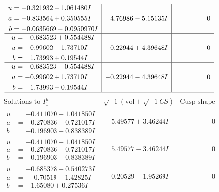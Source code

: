 \documentclass[1p]{elsarticle_modified}
\theoremstyle{definition}
\newcommand{\I}{\sqrt{-1}}
\begin{document}
$$\begin{array}{c|c|c}
\begin{aligned}
u &= -0.321932 - 1.061480 I \\
a &= -0.833564 + 0.350555 I \\
b &= -0.0635669 - 0.0950970 I\end{aligned}
 & \phantom{-}4.76986 - 5.15135 I & \phantom{-0.000000 } 0 \\ \hline\begin{aligned}
u &= \phantom{-}0.683523 + 0.554488 I \\
a &= -0.99602 - 1.73710 I \\
b &= \phantom{-}1.73993 + 0.19544 I\end{aligned}
 & -0.22944 + 4.39648 I & \phantom{-0.000000 } 0 \\ \hline\begin{aligned}
u &= \phantom{-}0.683523 - 0.554488 I \\
a &= -0.99602 + 1.73710 I \\
b &= \phantom{-}1.73993 - 0.19544 I\end{aligned}
 & -0.22944 - 4.39648 I & \phantom{-0.000000 } 0\\
 \hline 
 \end{array}$$\newpage$$\begin{array}{c|c|c}  
\text{Solutions to }I^u_{1}& \I (\text{vol} + \sqrt{-1}CS) & \text{Cusp shape}\\
 \hline 
\begin{aligned}
u &= -0.411070 + 1.041850 I \\
a &= -0.270836 + 0.721017 I \\
b &= -0.196903 - 0.838389 I\end{aligned}
 & \phantom{-}5.49577 + 3.46244 I & \phantom{-0.000000 } 0 \\ \hline\begin{aligned}
u &= -0.411070 - 1.041850 I \\
a &= -0.270836 - 0.721017 I \\
b &= -0.196903 + 0.838389 I\end{aligned}
 & \phantom{-}5.49577 - 3.46244 I & \phantom{-0.000000 } 0 \\ \hline\begin{aligned}
u &= -0.685378 + 0.540273 I \\
a &= \phantom{-}0.70519 - 1.42825 I \\
b &= -1.65080 + 0.27536 I\end{aligned}
 & \phantom{-}0.20529 - 1.95269 I & \phantom{-0.000000 } 0 \\ \hline\begin{aligned}

\end{aligned}
\end{array}$$
\end{document}
